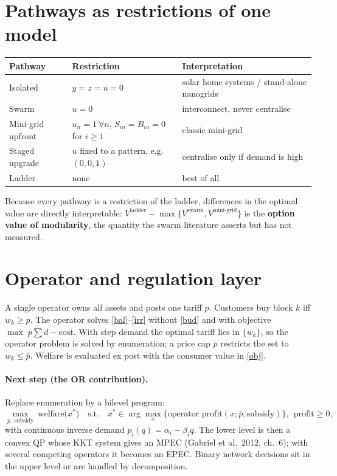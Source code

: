 \documentclass[11pt,a4paper]{article}
\begin{document}
\section{Pathways as restrictions of one model}
\begin{tabular}{@{}lll@{}}
\toprule
Pathway & Restriction & Interpretation\\
\midrule
Isolated & $y=z=u=0$ & solar home systems / stand-alone nanogrids\\
Swarm & $u=0$ & interconnect, never centralise\\
Mini-grid upfront & $u_n=1\ \forall n$, $S_{in}=B_{in}=0$ for $i\ge1$ & classic mini-grid\\
Staged upgrade & $u$ fixed to a pattern, e.g.\ $(0,0,1)$ & centralise only if demand is high\\
Ladder & none & best of all\\
\bottomrule
\end{tabular}

\medskip\noindent Because every pathway is a restriction of the ladder, differences in the optimal value
are directly interpretable: $V^{\text{ladder}}-\max\{V^{\text{swarm}},V^{\text{mini-grid}}\}$ is the
\textbf{option value of modularity}, the quantity the swarm literature asserts but has not measured.

\section{Operator and regulation layer}
A single operator owns all assets and posts one tariff $p$. Customers buy block $k$ iff
$w_k\ge p$. The operator solves \eqref{bal}--\eqref{irr} without \eqref{bud} and with objective
$\max\; p\sum d - \text{cost}$. With step demand the optimal tariff lies in $\{w_k\}$, so the
operator problem is solved by enumeration; a price cap $\bar p$ restricts the set to $w_k\le\bar p$.
Welfare is evaluated ex post with the consumer value in \eqref{obj}.

\paragraph{Next step (the OR contribution).} Replace enumeration by a bilevel program:
\[
\max_{\bar p,\ \text{subsidy}}\ \text{welfare}\big(x^\ast\big)\quad\text{s.t.}\quad
x^\ast\in\arg\max_x\{\text{operator profit}(x;\bar p,\text{subsidy})\},\ \ \text{profit}\ge0 ,
\]
with continuous inverse demand $p_i(q)=\alpha_i-\beta_iq$. The lower level is then a convex QP whose
KKT system gives an MPEC (Gabriel et al.\ 2012, ch.\ 6); with several competing operators it becomes
an EPEC. Binary network decisions sit in the upper level or are handled by decomposition.
\end{document}
